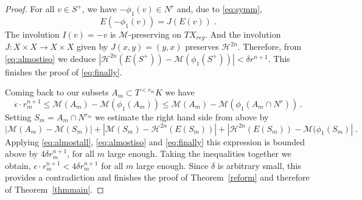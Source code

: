 \documentclass[12pt,leqno,intlimits]{amsart}
\numberwithin{equation}{section}
\newtheorem{lem}[thm]{Lemma}
\theoremstyle{definition}
\theoremstyle{remark}
\newcommand{\tref}[1]{Theorem~\ref{#1}}
\newcommand{\vol}{\mathrm{vol}}
\def\:{\colon}
\begin{document}
\begin{proof}
For all $v\in S^+$, we have $-\phi _1 (v) \in N^r$ and,   due to \eqref{eq:symm},
$$E(-\phi_1 (v)) =J(E(v)) \;.$$
The involution  $I(v)=-v$ is $\mathcal M$-preserving on $TX_{reg}$.  And the involution
 $J\:X\times X\to X\times X$ given by $J(x,y)=(y,x)$ preserves $\mathcal H^{2n}$. Therefore, from \eqref{eq:almostiso} we deduce
 $|\mathcal H^{2n} (E(S^+)) - \mathcal M (\phi _1 (S^+))|  <   \delta r^{n+1} $.
  This finishes the proof of \eqref{eq:finally}.


Coming back to our subsets $A_m\subset T^{<r_m} K$ we have
 $$\epsilon \cdot r_m^ {n+1} \leq \mathcal M ( A_m) - \mathcal M( \phi _1 (A_m)) \leq \mathcal M ( A_m) - \mathcal M( \phi _1 (A_m\cap N^r)) \,.$$
Setting  $S_m=A_m\cap N^{r_m}$ we estimate the right hand side from above by
$$|\mathcal M (A_m) -  \mathcal M(S_m)|
+|\mathcal M (S_m )  - \mathcal H^{2n} (E(S_m) )| + | \mathcal H ^{2n} (E(S_m)) - \mathcal M (\phi _1(S_m)|  \;.$$
Applying  \eqref{eq:almostall}, \eqref{eq:almostiso} and \eqref{eq:finally}  this expression is bounded above by $4 \delta r _m^{n+1}$, for all $m$ large enough. Taking the inequalities together we obtain,  $\epsilon \cdot r_m^ {n+1}< 4 \delta r _m^{n+1}$ for all $m$ large enough.
Since $\delta$ is arbitrary small, this provides a  contradiction  and  finishes the proof of \tref{reform} and therefore of \tref{thmmain}.
\end{proof}












\end{document}
